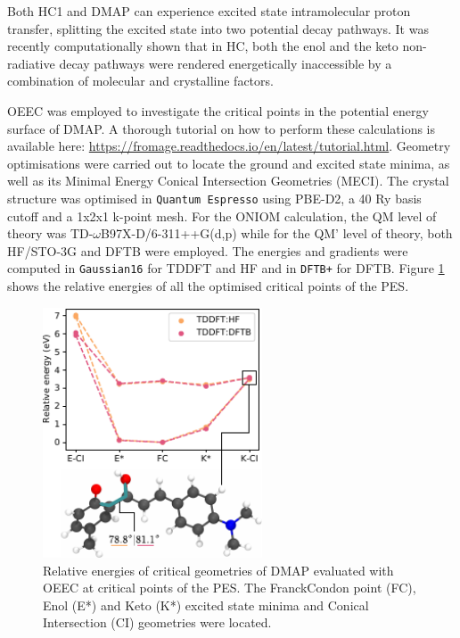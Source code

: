 Both HC1 and DMAP can experience excited state intramolecular proton transfer, splitting the excited state into two potential decay pathways. It was recently computationally shown that in HC, both the enol and the keto non-radiative decay pathways were rendered energetically inaccessible by a combination of molecular and crystalline factors.\cite{Dommett2017a,Dommett2017c}

OEEC was employed to investigate the critical points in the potential energy surface of DMAP. A thorough tutorial on how to perform these calculations is available here: \href{https://fromage.readthedocs.io/en/latest/tutorial.html}{https://fromage.readthedocs.io/en/latest/tutorial.html}. Geometry optimisations were carried out to locate the ground and excited state minima, as well as its Minimal Energy Conical Intersection Geometries (MECI). The crystal structure was optimised in \texttt{Quantum Espresso} using PBE-D2, a 40 Ry basis cutoff and a 1x2x1 k-point mesh. For the ONIOM calculation, the QM level of theory was TD-$\omega$B97X-D/6-311++G(d,p) while for the QM' level of theory, both HF/STO-3G and DFTB were employed. The energies and gradients were computed in \texttt{Gaussian16} for TDDFT and HF and in \texttt{DFTB+} for DFTB. Figure \ref{fig:pes_hc4} shows the relative energies of all the optimised critical points of the PES.

\begin{figure}[ht]
\centering
  \includegraphics[width=6.5cm]{Chapters/6Implementation/hc4_fig.pdf}
  \caption{Relative energies of critical geometries of DMAP evaluated with OEEC at critical points of the PES. The Franck\textendash{}Condon point (FC), Enol (E*) and Keto (K*) excited state minima and Conical Intersection (CI) geometries were located.}
  \label{fig:pes_hc4}
\end{figure}

